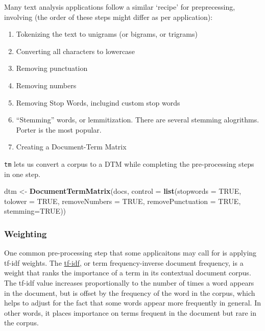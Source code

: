 \documentclass[]{book}
\newenvironment{Shaded}{\begin{snugshade}}{\end{snugshade}}
\newcommand{\DataTypeTok}[1]{\textcolor[rgb]{0.13,0.29,0.53}{#1}}
\newcommand{\KeywordTok}[1]{\textcolor[rgb]{0.13,0.29,0.53}{\textbf{#1}}}
\newcommand{\NormalTok}[1]{#1}
\newcommand{\OtherTok}[1]{\textcolor[rgb]{0.56,0.35,0.01}{#1}}
\newcommand{\StringTok}[1]{\textcolor[rgb]{0.31,0.60,0.02}{#1}}
\providecommand{\tightlist}{%
  \setlength{\itemsep}{0pt}\setlength{\parskip}{0pt}}
\begin{document}
Many text analysis applications follow a similar `recipe' for preprecessing, involving (the order of these steps might differ as per application):

\begin{enumerate}
\def\labelenumi{\arabic{enumi}.}
\tightlist
\item
  Tokenizing the text to unigrams (or bigrams, or trigrams)
\item
  Converting all characters to lowercase
\item
  Removing punctuation
\item
  Removing numbers
\item
  Removing Stop Words, inclugind custom stop words
\item
  ``Stemming'' words, or lemmitization. There are several stemming alogrithms. Porter is the most popular.
\item
  Creating a Document-Term Matrix
\end{enumerate}

\texttt{tm} lets us convert a corpus to a DTM while completing the pre-processing steps in one step.

\begin{Shaded}
\begin{Highlighting}[]
\NormalTok{dtm <-}\StringTok{ }\KeywordTok{DocumentTermMatrix}\NormalTok{(docs,}
           \DataTypeTok{control =} \KeywordTok{list}\NormalTok{(}\DataTypeTok{stopwords =} \OtherTok{TRUE}\NormalTok{,}
                          \DataTypeTok{tolower =} \OtherTok{TRUE}\NormalTok{,}
                          \DataTypeTok{removeNumbers =} \OtherTok{TRUE}\NormalTok{,}
                          \DataTypeTok{removePunctuation =} \OtherTok{TRUE}\NormalTok{,}
                          \DataTypeTok{stemming=}\OtherTok{TRUE}\NormalTok{))}
\end{Highlighting}
\end{Shaded}

\hypertarget{weighting}{%
\subsubsection*{Weighting}\label{weighting}}

One common pre-processing step that some applicaitons may call for is applying tf-idf weights. The \href{https://en.wikipedia.org/wiki/Tf\%E2\%80\%93idf}{tf-idf}, or term frequency-inverse document frequency, is a weight that ranks the importance of a term in its contextual document corpus. The tf-idf value increases proportionally to the number of times a word appears in the document, but is offset by the frequency of the word in the corpus, which helps to adjust for the fact that some words appear more frequently in general. In other words, it places importance on terms frequent in the document but rare in the corpus.
\end{document}
